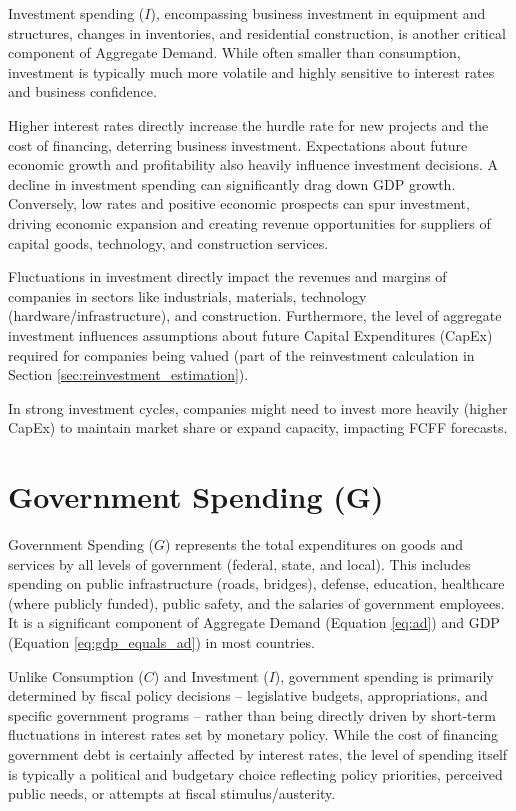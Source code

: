 Investment spending (\(I\)), encompassing business investment in equipment and structures, changes in inventories, and residential construction, is another critical component of Aggregate Demand. While often smaller than consumption, investment is typically much more volatile and highly sensitive to interest rates and business confidence.

Higher interest rates directly increase the hurdle rate for new projects and the cost of financing, deterring business investment. Expectations about future economic growth and profitability also heavily influence investment decisions. A decline in investment spending can significantly drag down GDP growth. Conversely, low rates and positive economic prospects can spur investment, driving economic expansion and creating revenue opportunities for suppliers of capital goods, technology, and construction services.

Fluctuations in investment directly impact the revenues and margins of companies in sectors like industrials, materials, technology (hardware/infrastructure), and construction. Furthermore, the level of aggregate investment influences assumptions about future Capital Expenditures (CapEx) required for companies being valued (part of the reinvestment calculation in Section \ref{sec:reinvestment_estimation}).

In strong investment cycles, companies might need to invest more heavily (higher CapEx) to maintain market share or expand capacity, impacting FCFF forecasts.

\section{Government Spending (G)} \label{sec:government_spending}

Government Spending (\(G\)) represents the total expenditures on goods and services by all levels of government (federal, state, and local). This includes spending on public infrastructure (roads, bridges), defense, education, healthcare (where publicly funded), public safety, and the salaries of government employees. It is a significant component of Aggregate Demand (Equation \ref{eq:ad}) and GDP (Equation \ref{eq:gdp_equals_ad}) in most countries.

Unlike Consumption (\(C\)) and Investment (\(I\)), government spending is primarily determined by fiscal policy decisions – legislative budgets, appropriations, and specific government programs – rather than being directly driven by short-term fluctuations in interest rates set by monetary policy. While the cost of financing government debt is certainly affected by interest rates, the level of spending itself is typically a political and budgetary choice reflecting policy priorities, perceived public needs, or attempts at fiscal stimulus/austerity.

